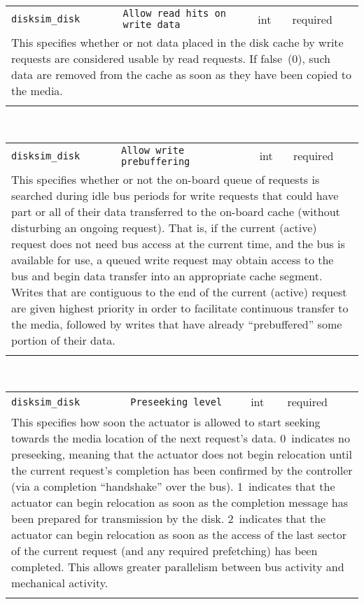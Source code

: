 \noindent 
\begin{tabular}{|p{\lpmodwidth}|p{\lpnamewidth}|p{0.5in}|p{0.5in}|}
\cline{1-4}
\texttt{disksim\_disk} & \texttt{Allow read hits on write data} & int & required \\ 
\cline{1-4}
\multicolumn{4}{|p{6in}|}{
This specifies whether or not data placed in the disk cache by write
requests are considered usable by read requests. If false~(0), such
data are removed from the cache as soon as they have been copied to
the media.
}\\ 
\cline{1-4}
\multicolumn{4}{p{5in}}{}\\
\end{tabular}\\ 
\noindent 
\begin{tabular}{|p{\lpmodwidth}|p{\lpnamewidth}|p{0.5in}|p{0.5in}|}
\cline{1-4}
\texttt{disksim\_disk} & \texttt{Allow write prebuffering} & int & required \\ 
\cline{1-4}
\multicolumn{4}{|p{6in}|}{
This specifies whether or not the on-board queue of requests is searched
during idle bus periods for write requests that could have part or all
of their data transferred to the on-board cache (without disturbing an
ongoing request). That is, if the current (active) request does not
need bus access at the current time, and the bus is available for use,
a queued write request may obtain access to the bus and begin data
transfer into an appropriate cache segment. Writes that are
contiguous to the end of the current (active) request are given
highest priority in order to facilitate continuous transfer to the
media, followed by writes that have already ``prebuffered'' some
portion of their data.
}\\ 
\cline{1-4}
\multicolumn{4}{p{5in}}{}\\
\end{tabular}\\ 
\noindent 
\begin{tabular}{|p{\lpmodwidth}|p{\lpnamewidth}|p{0.5in}|p{0.5in}|}
\cline{1-4}
\texttt{disksim\_disk} & \texttt{Preseeking level} & int & required \\ 
\cline{1-4}
\multicolumn{4}{|p{6in}|}{
This specifies how soon the actuator is allowed to start seeking towards
the media location of the next request's data.
0~indicates no preseeking, meaning that the actuator does not begin
relocation until the current request's completion has been confirmed
by the controller (via a completion ``handshake'' over the bus).
1~indicates that the actuator can begin relocation as soon as the
completion message has been prepared for transmission by the disk.
2~indicates that the actuator can begin relocation as soon as the
access of the last sector of the current request (and any required
prefetching) has been completed. This allows greater parallelism
between bus activity and mechanical activity.
}\\ 
\cline{1-4}
\multicolumn{4}{p{5in}}{}\\
\end{tabular}\\ 
